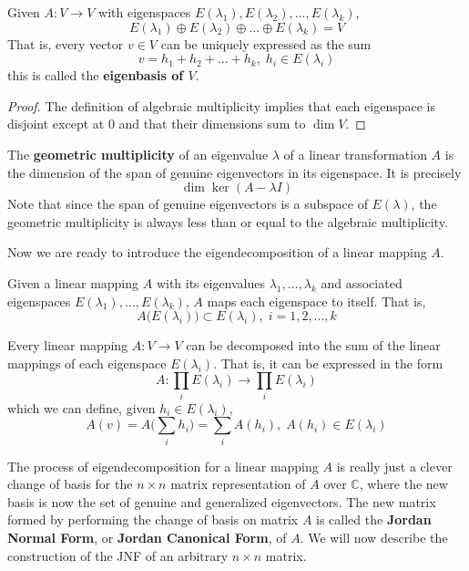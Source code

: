   \begin{theorem}
  Given $A: V \longrightarrow V$ with eigenspaces $E(\lambda_1), E(\lambda_2), ..., E(\lambda_k)$, 
  \[E(\lambda_1) \oplus E(\lambda_2) \oplus ... \oplus E(\lambda_k) = V\]
  That is, every vector $v \in V$ can be uniquely expressed as the sum 
  \[ v = h_1 + h_2 + ... + h_k, \; h_i \in E(\lambda_i)\]
  this is called the \textbf{eigenbasis of $V$}. 
  \end{theorem}
  \begin{proof}
  The definition of algebraic multiplicity implies that each eigenspace is disjoint except at $0$ and that their dimensions sum to $\dim{V}$. 
  \end{proof}

  \begin{definition}
  The \textbf{geometric multiplicity} of an eigenvalue $\lambda$ of a linear transformation $A$ is the dimension of the span of genuine eigenvectors in its eigenspace. It is precisely 
  \[\dim{\ker{(A - \lambda I)}}\]
  Note that since the span of genuine eigenvectors is a subspace of $E(\lambda)$, the geometric multiplicity is always less than or equal to the algebraic multiplicity. 
  \end{definition}

  Now we are ready to introduce the eigendecomposition of a linear mapping $A$.

  \begin{theorem}
  Given a linear mapping $A$ with its eigenvalues $\lambda_1, \ldots, \lambda_k$ and associated eigenspaces $E(\lambda_1), \ldots, E(\lambda_k)$, $A$ maps each eigenspace to itself. That is, 
  \[A\big( E(\lambda_i) \big) \subset E(\lambda_i), \; i = 1, 2, ..., k\]
  \end{theorem}

  \begin{corollary}
  Every linear mapping $A: V \longrightarrow V$ can be decomposed into the sum of the linear mappings of each eigenspace $E(\lambda_i)$. That is, it can be expressed in the form 
  \[A: \prod_i E(\lambda_i) \longrightarrow \prod_i E(\lambda_i)\]
  which we can define, given $h_i \in E(\lambda_i)$, 
  \[A(v) = A\bigg(\sum_i h_i \bigg) = \sum_i A(h_i), \; A(h_i) \in E(\lambda_i) \]
  \end{corollary}

  The process of eigendecomposition for a linear mapping $A$ is really just a clever change of basis for the $n \times n$ matrix representation of $A$ over $\mathbb{C}$, where the new basis is now the set of genuine and generalized eigenvectors. The new matrix formed by performing the change of basis on matrix $A$ is called the \textbf{Jordan Normal Form}, or \textbf{Jordan Canonical Form}, of $A$. We will now describe the construction of the JNF of an arbitrary $n \times n$ matrix. 

